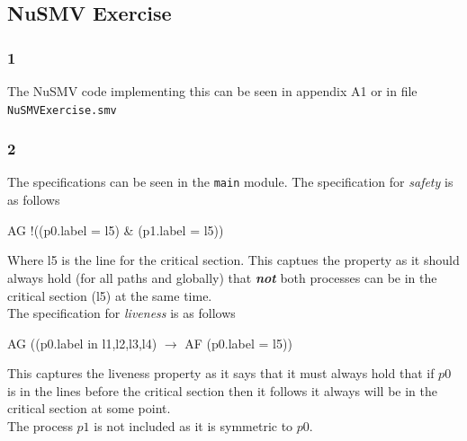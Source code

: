 \documentclass[12pt]{article}
\begin{document}
\subsection*{NuSMV Exercise}
\subsubsection*{1}
The NuSMV code implementing this can be seen in appendix A1 or in file \texttt{NuSMVExercise.smv}

\subsubsection*{2}
The specifications can be seen in the \texttt{main} module. The specification for \textit{safety} is as follows
\begin{center}
AG !((p0.label = l5) \& (p1.label = l5))
\end{center}
Where l5 is the line for the critical section. This captues the property as it should always hold (for all paths and globally) that \textit{\textbf{not}} both processes can be in the critical section (l5) at the same time.\\
The specification for \textit{liveness} is as follows
\begin{center}
AG ((p0.label in {l1,l2,l3,l4}) $\to$ AF (p0.label = l5))
\end{center}
This captures the liveness property as it says that it must always hold that if $p0$ is in the lines before the critical section then it follows it always will be in the critical section at some point.\\
The process $p1$ is not included as it is symmetric to $p0$.
\end{document}
